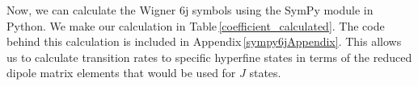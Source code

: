 %
%
%

Now, we can calculate the Wigner 6j symbols using the SymPy module in Python\cite{sympy}\cite{rasch6j}.
We make our calculation in Table\,\ref{coefficient_calculated}. %
The code behind this calculation is included in Appendix\,\ref{sympy6jAppendix}.
This allows us to calculate transition rates to specific hyperfine states in terms of the reduced dipole matrix elements that would be used for $J$ states.

